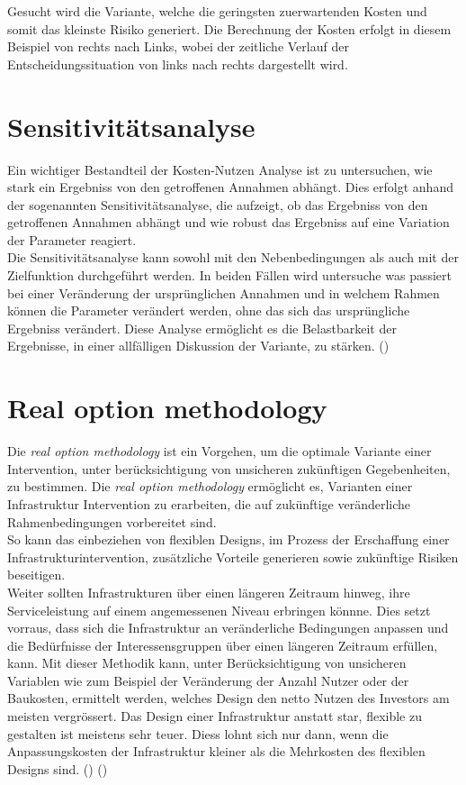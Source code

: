 Gesucht wird die Variante, welche die geringsten zuerwartenden Kosten und somit das kleinste Risiko generiert. Die Berechnung der Kosten erfolgt in diesem Beispiel von rechts nach Links, wobei der zeitliche Verlauf der Entscheidungssituation von links nach rechts dargestellt wird. 

\section{Sensitivitätsanalyse}
\label{sec:Sensitivität}

Ein wichtiger Bestandteil der Kosten-Nutzen Analyse ist zu untersuchen, wie stark ein Ergebniss von den getroffenen Annahmen abhängt. Dies erfolgt anhand der sogenannten Sensitivitätsanalyse, die aufzeigt, ob das Ergebniss von den getroffenen Annahmen abhängt und wie robust das Ergebniss auf eine Variation der Parameter reagiert. \\
Die Sensitivitätsanalyse kann sowohl mit den Nebenbedingungen als auch mit der Zielfunktion durchgeführt werden. In beiden Fällen wird untersuche was passiert bei einer Veränderung der ursprünglichen Annahmen und in welchem Rahmen können die Parameter verändert werden, ohne das sich das ursprüngliche Ergebniss verändert. 
Diese Analyse ermöglicht es die Belastbarkeit der Ergebnisse, in einer allfälligen Diskussion der Variante, zu stärken. (\cite{Adey2019})

\pagebreak
 
\section{Real option methodology}
\label{sec:RealOption}

Die \textit{real option methodology} ist ein Vorgehen, um die optimale Variante einer Intervention, unter berücksichtigung von unsicheren zukünftigen Gegebenheiten, zu bestimmen. 
Die \textit{real option methodology} ermöglicht es, Varianten einer Infrastruktur Intervention zu erarbeiten, die auf zukünftige veränderliche Rahmenbedingungen vorbereitet sind. \\
So kann das einbeziehen von flexiblen Designs, im Prozess der Erschaffung einer Infrastrukturintervention, zusätzliche Vorteile generieren sowie zukünftige Risiken beseitigen.  \\
Weiter sollten Infrastrukturen über einen längeren Zeitraum hinweg, ihre Serviceleistung auf einem angemessenen Niveau erbringen könnne. Dies setzt vorraus, dass sich die Infrastruktur an veränderliche Bedingungen anpassen und die Bedürfnisse der Interessensgruppen über einen längeren Zeitraum erfüllen, kann. 
Mit dieser Methodik kann, unter Berücksichtigung von unsicheren Variablen wie zum Beispiel der Veränderung der Anzahl Nutzer oder der Baukosten, ermittelt werden, welches Design den netto Nutzen des Investors am meisten vergrössert. 
Das Design einer Infrastruktur anstatt star, flexible zu gestalten ist meistens sehr teuer. Diess lohnt sich nur dann, wenn die Anpassungskosten der Infrastruktur kleiner als die Mehrkosten des flexiblen Designs sind.
(\cite{Neufville2011}) (\cite{Esders2015}) \cite{Martani2018}




%

